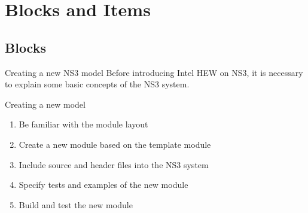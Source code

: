 \section{Blocks and Items}\label{sect:block}

\subsection{Blocks}
\begin{frame}{Creating a new NS3 model}
Before introducing Intel HEW on NS3, it is necessary to explain some basic concepts of the NS3 system.
\begin{block}{Creating a new model}
\begin{enumerate}
\item Be familiar with the module layout
\item Create a new module based on the template module
\item Include source and header files into the NS3 system
\item Specify tests and examples of the new module
\item Build and test the new module
\end{enumerate}
\end{block}
\end{frame}

